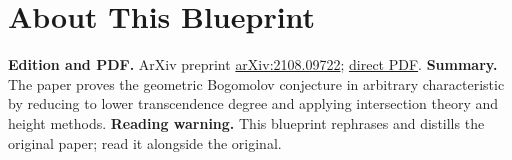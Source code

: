 

\chapter*{About This Blueprint}
\label{geometric-bogomolov-conjecture-arbitrary-characteristics-about}

\textbf{Edition and PDF.} ArXiv preprint \href{https://arxiv.org/abs/2108.09722}{arXiv:2108.09722};
\href{https://arxiv.org/pdf/2108.09722}{direct PDF}.
\textbf{Summary.} The paper proves the geometric Bogomolov conjecture in arbitrary characteristic by reducing
to lower transcendence degree and applying intersection theory and height methods.
\textbf{Reading warning.} This blueprint rephrases and distills the original paper; read it alongside the original.










